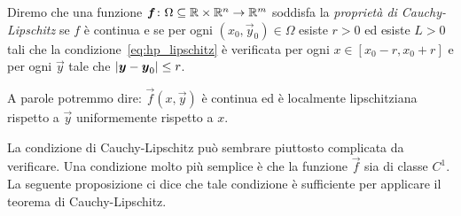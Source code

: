\begin{definition}%
\label{def:cauchy_lipschitz}%
Diremo che una funzione $\boldsymbol f\colon \Omega\subseteq {\mathbb R}\times {\mathbb R}^n \to {\mathbb R}^m$
soddisfa la \emph{proprietà di Cauchy-Lipschitz}%
 se $f$ è continua e se
per ogni $(x_0,\vec y_0)\in \Omega$ esiste $r>0$ ed esiste $L>0$
tali che la condizione~\eqref{eq:hp_lipschitz} è verificata 
per ogni $x\in [x_0-r, x_0+r]$ e per ogni $\vec y$ tale 
che ${\left|\boldsymbol y-\boldsymbol y_0\right|}\le r$.

A parole potremmo dire: $\vec f(x,\vec y)$ è continua ed è 
localmente lipschitziana rispetto a $\vec y$ uniformemente
rispetto a $x$.
\end{definition}
 
La condizione di Cauchy-Lipschitz può sembrare piuttosto complicata
da verificare. Una condizione molto più semplice  è che la funzione $\vec f$
sia di classe $C^1$. La seguente proposizione ci dice che tale
condizione è sufficiente per applicare il teorema di Cauchy-Lipschitz.

